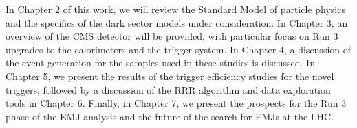 In Chapter 2 of this work, we will review the Standard Model of particle physics and the specifics of the dark sector models under consideration. In Chapter 3, an overview of the CMS detector will be provided, with particular focus on Run 3 upgrades to the calorimeters and the trigger system. In Chapter 4, a discussion of the event generation for the samples used in these studies is discussed. In Chapter 5, we present the results of the trigger efficiency studies for the novel triggers, followed by a discussion of the RRR algorithm and data exploration tools in Chapter 6. Finally, in Chapter 7, we present the prospects for the Run 3 phase of the EMJ analysis and the future of the search for EMJs at the LHC.